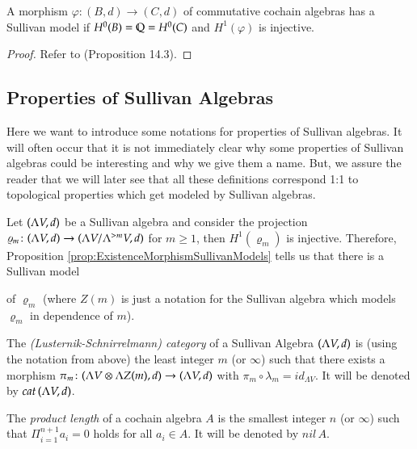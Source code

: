 \begin{Proposition}
\label{prop:ExistenceMorphismSullivanModels}
 A morphism $\varphi \colon (B,d) \to (C,d)$ of commutative cochain algebras has a Sullivan model
 if $H^0(B) = \mathbb{Q} = H^0(C)$ and $H^1(\varphi)$ is injective.
\end{Proposition}
\begin{proof}
 Refer to \cite{Felix2001} (Proposition 14.3).
\end{proof}

\subsection{Properties of Sullivan Algebras}
Here we want to introduce some notations for properties of Sullivan algebras. It will often occur that it is not 
immediately clear why some properties of Sullivan algebras could be interesting and why we give them a name. But, we assure
the reader that we will later see that all these definitions correspond 1:1 to topological properties which
get modeled by Sullivan algebras.
\par

Let $(\Lambda V,d)$ be a Sullivan algebra and consider the projection 
$\varrho_m \colon (\Lambda V,d) \to (\Lambda V / \Lambda^{> m} V , d)$ for $m \geq 1$, then $H^1(\varrho_m)$ is injective.
Therefore, Proposition \ref{prop:ExistenceMorphismSullivanModels} tells us that there is a Sullivan model

\centerline{
}

of $\varrho_m$ (where $Z(m)$ is just a notation for the Sullivan algebra which models $\varrho_m$ in dependence of $m$).

\begin{Definition}
\label{def:LSCategory}
 The \emph{(Lusternik-Schnirrelmann) category} of a Sullivan Algebra $(\Lambda V,d)$ is (using the notation from above) the 
 least integer $m$ (or $\infty$) such that there exists a morphism 
 $\pi_m \colon (\Lambda V \otimes \Lambda Z(m) , d) \to (\Lambda V,d)$ with $\pi_m \circ \lambda_m = id_{\Lambda V}$.
 It will be denoted by $cat \, (\Lambda V,d)$.
\end{Definition}

\begin{Definition}
 The \emph{product length} of a cochain algebra $A$ is the smallest integer $n$ (or $\infty$) such that 
 $\Pi_{i = 1}^{n+1} a_i = 0$ holds for all $a_i \in A$. It will be denoted by $nil \,A$.
\end{Definition}

